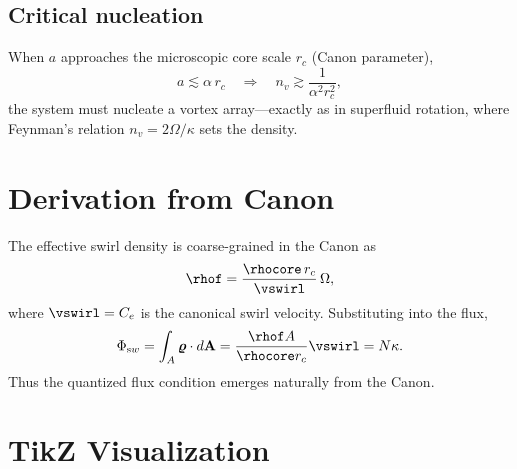 \documentclass[11pt,a4paper]{article}
\begin{document}
    \subsection*{Critical nucleation}
        When $a$ approaches the microscopic core scale $r_c$ (Canon parameter),
        \begin{equation}
        a \lesssim \alpha\,r_c \quad \Longrightarrow \quad
        n_v \gtrsim \frac{1}{\alpha^2 r_c^2},
        \end{equation}
        the system must nucleate a vortex array---exactly as in superfluid rotation, where Feynman's relation $n_v=2\Omega/\kappa$ sets the density.

\section{Derivation from Canon}
    The effective swirl density is coarse-grained in the Canon as
    \begin{equation}
    \rhof = \frac{\rhocore\,r_c}{\vswirl}\,\Omega,
    \end{equation}
    where $\vswirl=C_e$ is the canonical swirl velocity. Substituting into the flux,
    \begin{equation}
    \Phi_{\textrm sw} = \int_A \bm{\varrho}\cdot d\mathbf A
    = \frac{\rhof A}{\rhocore r_c} \vswirl
    = N\kappa.
    \end{equation}
    Thus the quantized flux condition emerges naturally from the Canon.

\section{TikZ Visualization}
    \begin{center}
    \end{center}
\end{document}
